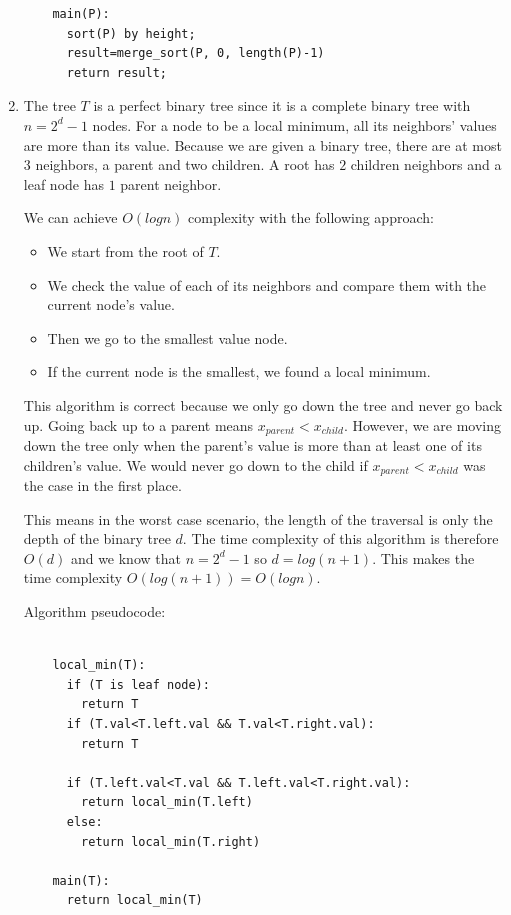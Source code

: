 \documentclass{article}
\begin{document}
\begin{enumerate}
\begin{lstlisting}
    main(P):
      sort(P) by height;
      result=merge_sort(P, 0, length(P)-1)
      return result;

  \end{lstlisting}
  \item The tree $T$ is a perfect binary tree since it is a complete binary tree with $n=2^d-1$ nodes.
  For a node to be a local minimum, all its neighbors' values are more than its value.
  Because we are given a binary tree, there are at most $3$ neighbors, a parent and two children.
  A root has $2$ children neighbors and a leaf node has $1$ parent neighbor.

  We can achieve $O(logn)$ complexity with the following approach:

  \begin{itemize}
    \item We start from the root of $T$.
    \item We check the value of each of its neighbors and compare them with the current node's value.
    \item Then we go to the smallest value node.
    \item If the current node is the smallest, we found a local minimum.
  \end{itemize}

  This algorithm is correct because we only go down the tree and never go back up.
  Going back up to a parent means $x_{parent}<x_{child}$.
  However, we are moving down the tree only when the parent's value is more than at least one of its children's value.
  We would never go down to the child if $x_{parent}<x_{child}$ was the case in the first place.

  This means in the worst case scenario, the length of the traversal is only the depth of the binary tree $d$.
  The time complexity of this algorithm is therefore $O(d)$ and we know that $n=2^d-1$ so $d=log(n+1)$.
  This makes the time complexity $O(log(n+1))=O(logn)$.

  Algorithm pseudocode:

  \begin{lstlisting}

    local_min(T):
      if (T is leaf node):
        return T
      if (T.val<T.left.val && T.val<T.right.val):
        return T
      
      if (T.left.val<T.val && T.left.val<T.right.val):
        return local_min(T.left)
      else:
        return local_min(T.right)
    
    main(T):
      return local_min(T)


\end{lstlisting}
\end{enumerate}
\end{document}
